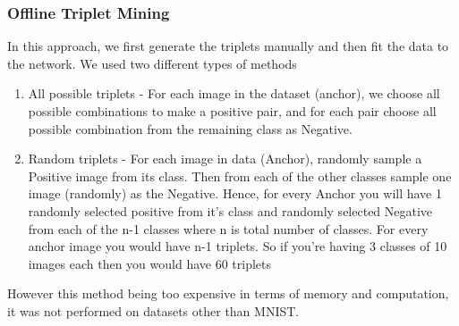 \documentclass[
12pt,
tightenlines,
aps,
prb,
twocolumn,
superscriptaddress,
longbibliography,
floatfix
]{revtex4-2}
\begin{document}
\subsubsection{Offline Triplet Mining}
\vspace{-5mm}
In this approach, we first generate the triplets manually and then fit the data to the network. We used two different types of methods
\begin{raggedright}
\begin{enumerate}
    \item All possible triplets - For each image in the dataset (anchor), we choose all possible combinations to make a positive pair, and for each pair choose all possible combination from the remaining class as Negative.
    \item Random triplets - For each image in data (Anchor), randomly sample a Positive image from its class.  Then from each of the other classes sample one image (randomly) as the Negative. Hence, for every Anchor you will have 1 randomly selected positive from it's class and randomly selected Negative from each of the n-1 classes where n is total number of classes.  For every anchor image you would have n-1 triplets. So if you're having 3 classes of 10 images each then you would have 60 triplets
\end{enumerate}
\end{raggedright}
 However this method being too expensive in terms of memory and computation, it was not performed on datasets other than MNIST.

\end{document}
